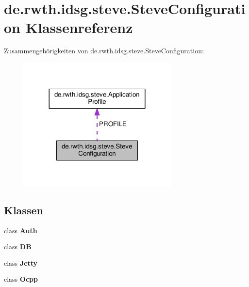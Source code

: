 \hypertarget{classde_1_1rwth_1_1idsg_1_1steve_1_1_steve_configuration}{\section{de.\-rwth.\-idsg.\-steve.\-Steve\-Configuration Klassenreferenz}
\label{classde_1_1rwth_1_1idsg_1_1steve_1_1_steve_configuration}
}


Zusammengehörigkeiten von de.\-rwth.\-idsg.\-steve.\-Steve\-Configuration\-:\nopagebreak
\begin{figure}[H]
\begin{center}
\leavevmode
\includegraphics[width=228pt]{classde_1_1rwth_1_1idsg_1_1steve_1_1_steve_configuration__coll__graph}
\end{center}
\end{figure}
\subsection*{Klassen}
\begin{DoxyCompactItemize}
\item 
class {\bfseries Auth}
\item 
class {\bfseries D\-B}
\item 
class {\bfseries Jetty}
\item 
class {\bfseries Ocpp}
\end{DoxyCompactItemize}
